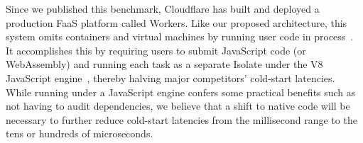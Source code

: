 Since we published this benchmark, Cloudflare has built and deployed a production
FaaS platform called Workers.  Like our proposed architecture, this system omits
containers and virtual machines by running user code in
process~\cite{www-cloudflare-workers}.  It accomplishes this by requiring users to
submit JavaScript code (or WebAssembly) and running each task as a separate Isolate
under the V8 JavaScript engine~\cite{www-javascript-v8}, thereby halving major
competitors' cold-start latencies.  While running under a JavaScript engine confers
some practical benefits such as not having to audit dependencies, we believe that a
shift to native code will be necessary to further reduce cold-start latencies from
the millisecond range to the tens or hundreds of microseconds.
